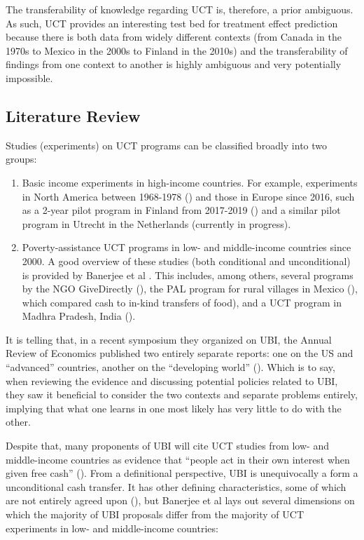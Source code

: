\documentclass[a4paper,12pt]{article}
\begin{document}
The transferability of knowledge regarding UCT is, therefore, a prior ambiguous. As such, UCT provides an interesting test bed for treatment effect prediction because there is both data from widely different contexts (from Canada in the 1970s to Mexico in the 2000s to Finland in the 2010s) and the transferability of findings from one context to another is highly ambiguous and very potentially impossible.

\subsection{ Literature Review }

Studies (experiments) on UCT programs can be classified broadly into two groups:

\begin{enumerate}
\item Basic income experiments in high-income countries. For example, experiments in North America between 1968-1978 (\cite{Forget2011}) and those in Europe since 2016, such as a 2-year pilot program in Finland from 2017-2019 (\cite{Kangas2019}) and a similar pilot program in Utrecht in the Netherlands (currently in progress).

\item Poverty-assistance UCT programs in low- and middle-income countries since 2000. A good overview of these studies (both conditional and unconditional) is provided by Banerjee et al \parencite*{Banerjee2017}. This includes, among others, several programs by the NGO GiveDirectly (\cite{Blattman2016}), the PAL program for rural villages in Mexico (\cite{Cunha2019}), which compared cash to in-kind transfers of food), and a UCT program in Madhra Pradesh, India (\cite{bharat2014little}).

\end{enumerate}

It is telling that, in a recent symposium they organized on UBI, the Annual Review of Economics published two entirely separate reports: one on the US and ``advanced'' countries, another on the ``developing world'' (\cite{Hoynes2019, Banerjee2019}). Which is to say, when reviewing the evidence and discussing potential policies related to UBI, they saw it beneficial to consider the two contexts and separate problems entirely, implying that what one learns in one most likely has very little to do with the other.

Despite that, many proponents of UBI will cite UCT studies from low- and middle-income countries as evidence that ``people act in their own interest when given free cash'' (\cite{van2017basic}). From a definitional perspective, UBI is unequivocally a form a unconditional cash transfer. It has other defining characteristics, some of which are not entirely agreed upon (\cite{Hoynes2019}), but Banerjee et al \parencite*{Banerjee2019} lays out several dimensions on which the majority of UBI proposals differ from the majority of UCT experiments in low- and middle-income countries:
\end{document}
